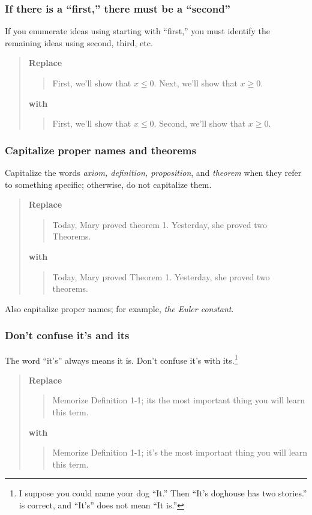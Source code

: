 \documentclass[12pt]{article}
\newcounter{ex}\setcounter{ex}{0}
\newcounter{id}\setcounter{id}{0}
\newcounter{se}\setcounter{se}{0}
\begin{document}
 \subsubsection{ If there is a ``first,'' there must be a ``second''}

If you enumerate ideas using starting with ``first,'' you must identify
the remaining ideas using second, third, etc.

\begin{quote}
\textbf{\textbf{Replace}}
\begin{quote}
First, we'll show that \(x \leq 0\). Next, we'll show that
\(x \geq 0\).
\end{quote}
\textbf{with}
\begin{quote}
First, we'll show that \(x \leq 0\).  Second, we'll show that
\mbox{\(x \geq 0\)}.
\end{quote}
\end{quote}



 \subsubsection{  Capitalize proper names and theorems}

Capitalize the words {\em axiom, definition, proposition\/}, and {\em theorem\/}
when they refer to something specific; otherwise, do not
capitalize them.

\begin{quote}
\textbf{\textbf{Replace}}
\begin{quote}
Today, Mary proved theorem 1. Yesterday, she proved two Theorems.
\end{quote}
\textbf{with}
\begin{quote}
Today, Mary proved Theorem 1. Yesterday, she proved two theorems.
\end{quote}
\end{quote}
Also capitalize proper names; for example, \emph{the Euler
constant}. 


 \subsubsection{  Don't confuse it's and its}

The word ``it's'' always means it is. Don't confuse it's with its.\footnote{I suppose you
could name your dog ``It.'' Then ``It's doghouse has two stories.'' is correct,
and ``It's'' does not mean ``It is.''} 

\begin{quote}
\textbf{\textbf{Replace}}
\begin{quote}
Memorize Definition 1-1; its the most important thing you will learn
this term.
\end{quote}
\textbf{with}
\begin{quote}
Memorize Definition 1-1; it's the most important thing you will learn
this term.
\end{quote}
\end{quote}
\end{document}
